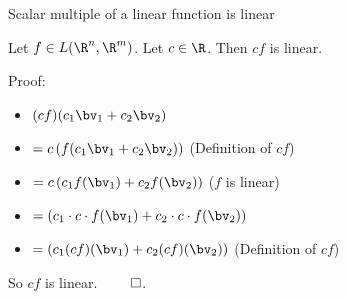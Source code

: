 \documentclass{beamer}
\begin{document}
\begin{frame}{Scalar multiple of a linear function is linear}

\begin{lemma}
Let $f\in L(\R^n, \R^m)$. Let $c\in\R$. Then $c f$ is linear.
\end{lemma}

\pause

Proof:

\pause

\begin{itemize}
\item $(c f)(c_1 \bv_1 + c_2 \bv_2)$
\item $=c \left (f(c_1 \bv_1 + c_2 \bv_2) \right )$ \quad (Definition of $c f$)
\item $= c \left(c_1 f(\bv_1) + c_2 f(\bv_2)  \right)$ \quad ($f$ is linear)
\item $= \left(c_1 \cdot c \cdot f(\bv_1) + c_2 \cdot c \cdot f(\bv_2)  \right)$
\item $= \left(c_1 (c f)(\bv_1) + c_2 (c f)(\bv_2)  \right)$ \quad (Definition of $c f$)
\end{itemize}

\pause

So $c f$ is linear. $\qed$.

\end{frame}
\end{document}
